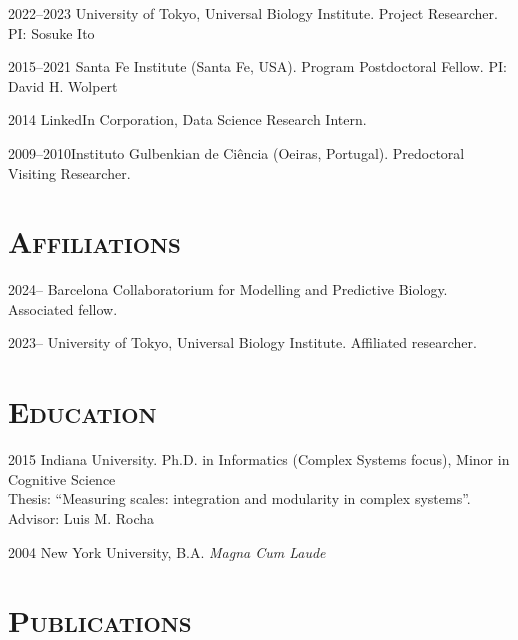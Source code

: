 \documentclass[margin,line,centered]{res}
\newcommand\sbigtab{\tabto{1.8cm}}
\begin{document}
\begin{resume}
2022--2023 \sbigtab University of Tokyo, Universal Biology Institute. Project Researcher. \tabto{12cm}  PI: Sosuke Ito

2015--2021 \sbigtab Santa Fe Institute (Santa Fe, USA). Program Postdoctoral Fellow. \tabto{12cm}  PI: David H. Wolpert

2014 \sbigtab LinkedIn Corporation, Data Science Research Intern. 

2009--2010\sbigtab Instituto Gulbenkian de Ciência (Oeiras, Portugal). Predoctoral Visiting Researcher. 


\section{\textsc{Affiliations}}

2024-- \sbigtab Barcelona Collaboratorium for Modelling and Predictive Biology. Associated fellow.

2023-- \sbigtab University of Tokyo, Universal Biology Institute. Affiliated researcher.


\section{\textsc{Education}}

2015 \; Indiana University. Ph.D. in Informatics (Complex Systems focus), Minor in Cognitive Science \\%
\tabto{1cm} Thesis: ``Measuring scales: integration and modularity in complex systems''. \tabto{12cm}  Advisor: Luis M. Rocha

2004 \; {New York University}, B.A. \emph{Magna Cum Laude} %


\section{\textsc{Publications}
}
{
  \setlength{\parskip}{3pt}
  
}



\end{resume}
\end{document}
